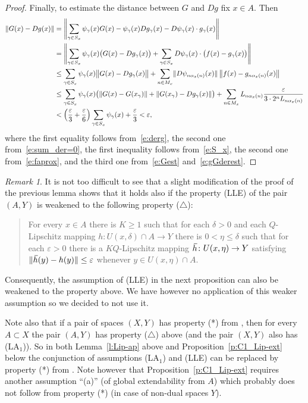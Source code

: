 \documentclass[a4paper,twoside,10pt,reqno,draft]{amsart}
\theoremstyle{definition}
\theoremstyle{remark}
\newtheorem{remark}[theorem]{Remark}
\newcommand\norm[1]{\mathopen\|#1\mathclose\|}
\newcommand\norma[1]{\left\|#1\right\|}
\newcommand\normb[2]{\csname#1l\endcsname\|#2\csname#1r\endcsname\|}
\newcommand{\cl}[2][3]{{}\mkern#1mu\overline{\mkern-#1mu#2}}
\newcommand\al{\alpha}
\newcommand\ga{\gamma}
\newcommand\de{\delta}
\newcommand\ve{\varepsilon}
\newcommand\pLA[1]{(LA$_#1$)}
\newcommand\pLLE{(LLE)}
\begin{document}
\begin{proof}
Finally, to estimate the distance between $G$ and $Dg$ fix $x\in A$.
Then
\[\begin{split}
\norm{G(x)-Dg(x)}&=\normb{Bigg}{\sum_{\ga\in S_x}\psi_\ga(x)G(x)-\psi_\ga(x)Dg_\ga(x)-D\psi_\ga(x)\cdot g_\ga(x)}\\
&=\normb{Bigg}{\sum_{\ga\in S_x}\psi_\ga(x)\bigl(G(x)-Dg_\ga(x)\bigr)+\sum_{\ga\in S_x}D\psi_\ga(x)\cdot\bigl(f(x)-g_\ga(x)\bigr)}\\
&\le\sum_{\ga\in S_x}\psi_\ga(x)\normb{big}{G(x)-Dg_\ga(x)}+\sum_{n\in M_x}\norm{D\psi_{n\al_x(n)}(x)}\norma{f(x)-g_{n\al_x(n)}(x)}\\
&\le\sum_{\ga\in S_x}\psi_\ga(x)\bigl(\norm{G(x)-G(x_\ga)}+\norm{G(x_\ga)-Dg_\ga(x)}\bigr)+\sum_{n\in M_x}L_{n\al_x(n)}\frac\ve{3\cdot2^nL_{n\al_x(n)}}\\
&<\left(\frac\ve3+\frac\ve6\right)\sum_{\ga\in S_x}\psi_\ga(x)+\frac\ve3<\ve,
\end{split}\]
where the first equality follows from~\eqref{e:derg}, the second one from~\eqref{e:sum_der=0},
the first inequality follows from~\eqref{e:S_x}, the second one from~\eqref{e:faprox}, and the third one from~\eqref{e:Gest} and~\eqref{e:gGderest}.
\end{proof}

\begin{remark}
It is not too difficult to see that a slight modification of the proof of the previous lemma shows that it holds also if the property {\pLLE} of the pair $(A,Y)$ is weakened to the following property ($\triangle$):
\begin{quote}
For every $x\in A$ there is $K\ge1$ such that for each $\de>0$ and each $Q$-Lipschitz mapping $h\colon U(x,\de)\cap A\to Y$
there is $0<\eta\le\de$ such that for each $\ve>0$ there is a $KQ$-Lipschitz mapping $\cl h\colon U(x,\eta)\to Y$ satisfying $\norm{\cl h(y)-h(y)}\le\ve$ whenever $y\in U(x,\eta)\cap A$.
\end{quote}
Consequently, the assumption of {\pLLE} in the next proposition can also be weakened to the property above.
We have however no application of this weaker assumption so we decided to not use it.

Note also that if a pair of spaces $(X,Y)$ has property (*) from \cite{JS2}, then for every $A\subset X$ the pair $(A,Y)$ has property ($\triangle$) above (and the pair $(X,Y)$ also has \pLA1).
So in both Lemma~\ref{l:Lip-ap} above and Proposition~\ref{p:C1_Lip-ext} below the conjunction of assumptions \pLA1 and {\pLLE} can be replaced by property (*) from \cite{JS2}.
Note however that Proposition~\ref{p:C1_Lip-ext} requires another assumption ``(a)'' (of global extendability from $A$) which probably does not follow from property (*) (in case of non-dual spaces $Y$).
\end{remark}
\end{document}
